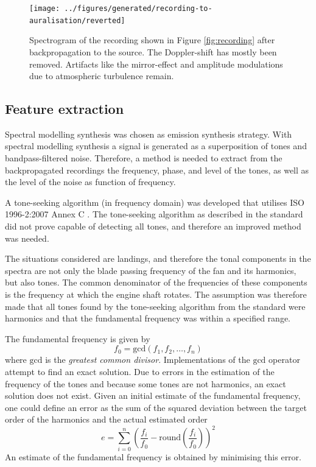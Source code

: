 \begin{figure}[H]
  \centering
  \texttt{[image: ../figures/generated/recording-to-auralisation/reverted]}
  \caption{Spectrogram of the recording shown in Figure \ref{fig:recording} after backpropagation to the source. The Doppler-shift has mostly been removed. Artifacts like the mirror-effect and amplitude modulations due to atmospheric turbulence remain.}
  \label{fig:backpropagated}
\end{figure}

\subsection{Feature extraction}
Spectral modelling synthesis was chosen as emission synthesis strategy. With
spectral modelling synthesis a signal is generated as a superposition of tones
and bandpass-filtered noise.
Therefore, a method is needed to extract from the backpropagated recordings the
frequency, phase, and level of the tones, as well as the level of the noise as
function of frequency.

A tone-seeking algorithm (in frequency domain) was developed \cite{Rietdijk2016}
that utilises ISO 1996-2:2007 Annex C \cite{ISO1996-2_2007}. The tone-seeking
algorithm as described in the standard did not prove capable of detecting all
tones, and therefore an improved method was needed.

The situations considered are landings, and therefore the tonal components
in the spectra are not only the blade passing frequency of the fan and its
harmonics, but also  tones. The common denominator of the frequencies of
these components is the frequency at which the engine shaft rotates.
The assumption was therefore made that all tones found by the
tone-seeking algorithm from the standard were harmonics and that the fundamental
frequency was within a specified range.

The fundamental frequency is given by
\begin{equation}
 f_{0} = \mathrm{gcd}\left(f_1, f_2, \dots, f_n \right)
\end{equation}
where $\mathrm{gcd}$ is the \emph{greatest common divisor}.
Implementations of the $\mathrm{gcd}$ operator attempt to find an exact solution.
Due to errors in the estimation of the frequency of the tones and because some tones are
not harmonics, an exact solution does not exist. Given an initial estimate of
the fundamental frequency, one could define an error as the sum of the squared
deviation between the target order of the harmonics and the actual estimated
order
\begin{equation}
 e = \sum_{i=0}^{n} \left( \frac{f_i}{f_0} - \mathrm{round}\left(\frac{f_i}{f_0}\right) \right)^2
\end{equation}
An estimate of the fundamental frequency is obtained by minimising this error.

